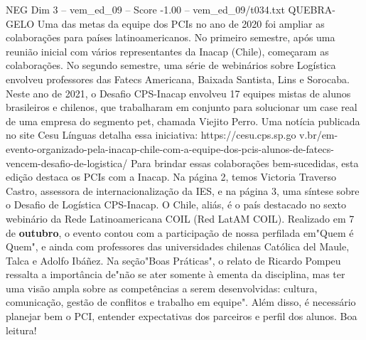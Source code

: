 \begin{textsample}{NEG Dim 3 – vem\_ed\_09 – Score -1.00 – vem\_ed\_09/t034.txt}  \label{ex:f3_neg_029}
QUEBRA-GELO Uma das metas da equipe dos PCIs no ano de 2020 foi ampliar as colaborações para países latinoamericanos.
No primeiro semestre, após uma reunião inicial com vários representantes da Inacap (Chile), começaram as colaborações.
No segundo semestre, uma série de webinários sobre Logística envolveu professores das Fatecs Americana, Baixada Santista, Lins e Sorocaba.
Neste ano de 2021, o Desafio CPS-Inacap envolveu 17 equipes mistas de alunos brasileiros e chilenos, que trabalharam em conjunto para solucionar um case real de uma empresa do segmento pet, chamada Viejito Perro.
Uma notícia publicada no site Cesu Línguas detalha essa iniciativa: https://cesu.cps.sp.go v.br/em-evento-organizado-pela-inacap-chile-com-a-equipe-dos-pcis-alunos-de-fatecs-vencem-desafio-de-logistica/ Para brindar essas colaborações bem-sucedidas, esta edição destaca os PCIs com a Inacap.
Na página 2, temos Victoria Traverso Castro, assessora de internacionalização da IES, e na página 3, uma síntese sobre o Desafio de Logística CPS-Inacap.
O Chile, aliás, é o país destacado no sexto webinário da Rede Latinoamericana COIL (Red LatAM COIL).
Realizado em 7 de \textbf{outubro}, o evento contou com a participação de nossa perfilada em"Quem é Quem", e ainda com professores das universidades chilenas Católica del Maule, Talca e Adolfo Ibáñez.
Na seção"Boas Práticas", o relato de Ricardo Pompeu ressalta a importância de"não se ater somente à ementa da disciplina, mas ter uma visão ampla sobre as competências a serem desenvolvidas: cultura, comunicação, gestão de conflitos e trabalho em equipe".
Além disso, é necessário planejar bem o PCI, entender expectativas dos parceiros e perfil dos alunos.
Boa leitura!

\end{textsample}

